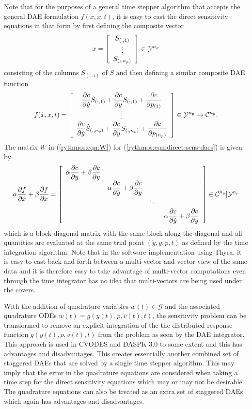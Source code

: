 \documentclass[pdf,ps2pdf,11pt]{SANDreport}
\begin{document}
Note that for the purposes of a general time stepper algorithm that accepts
the general DAE formulation $f(\dot{x},x,t)$, it is easy to cast the direct
sensitivity equations in that form by first defining the composite vector
%
\begin{equation}
x =
{\bmat{c}
S_{(:,1)} \\ \vdots \\ S_{(:,n_p)}
\emat}
\in \mathcal{Y}^{n_p}
\end{equation}
%
consisting of the columns $S_{(:,i)}$ of $S$ and then defining a similar
composite DAE function
%
\begin{equation}
f(\dot{x},x,t) =
{\bmat{c}
%
\Jac{c}{\dot{y}} \dot{S}_{(:,1)}
+ \Jac{c}{y} S_{(:,1)}
+ \Jac{c}{p_{(1)}} \\
%
\vdots \\
%
\Jac{c}{\dot{y}} \dot{S}_{(:,n_p)}
+ \Jac{c}{y} S_{(:,n_p)}
+ \Jac{c}{p_{(n_p)}}
%
\emat}
\in \mathcal{Y}^{n_p} \rightarrow \mathcal{C}^{n_p}.
\label{rythmos:eqn:direct-sens-daes}
\end{equation}
%
The matrix $W$ in (\ref{rythmos:eqn:W}) for
(\ref{rythmos:eqn:direct-sens-daes}) is given by
%
\begin{equation}
\alpha \Jac{f}{\dot{x}} + \beta \Jac{f}{x} = 
{\bmat{cccc}
\alpha \Jac{c}{\dot{y}} + \beta \Jac{c}{y} \\
& \alpha \Jac{c}{\dot{y}} + \beta \Jac{c}{y} \\
& & \ddots \\
& & & \alpha \Jac{c}{\dot{y}} + \beta \Jac{c}{y}
\emat}
\in \mathcal{C}^{n_p}|\mathcal{Y}^{n_p}
\label{rythmos:eqn:direct-sens-daes-jac}
\end{equation}
%
which is a block diagonal matrix with the same block along the diagonal and
all quantities are evaluated at the same trial point $(\dot{y},y,p,t)$ as
defined by the time integration algorithm.  Note that in the software
implementation using Thyra, it is easy to cast back and forth between a
multi-vector and vector view of the same data and it is therefore easy to take
advantage of multi-vector computations even through the time integrator has no
idea that multi-vectors are being used under the covers.

With the addition of quadrature variables $w(t)\in\mathcal{G}$ and the
associated quadrature ODEs $\dot{w}(t) = g(y(t),p,v(t),t)$, the sensitivity
problem can be transformed to remove an explicit integration of the the
distributed response function $g(y(t),p,v(t),t)$ from the problem as seen by
the DAE integrator.  This approach is used in CVODES and DASPK 3.0 to some
extent and this has advantages and disadvantages.  This creates essentially
another combined set of staggered DAEs that are solved by a single time
stepper algorithm.  This may imply that the error in the quadrature equations
are considered when taking a time step for the direct sensitivity equations
which may or may not be desirable.  The quadrature equations can also be
treated as an extra set of staggered DAEs which again has advantages and
disadvantages.
\end{document}
